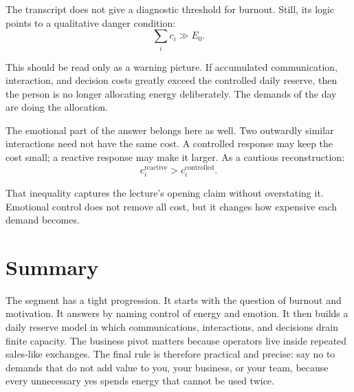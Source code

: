 The transcript does not give a diagnostic threshold for burnout. Still, its logic points to a qualitative danger condition:
\begin{equation}
\sum_i c_i \gg E_0.
\end{equation}

This should be read only as a warning picture. If accumulated communication, interaction, and decision costs greatly exceed the controlled daily reserve, then the person is no longer allocating energy deliberately. The demands of the day are doing the allocation.

The emotional part of the answer belongs here as well. Two outwardly similar interactions need not have the same cost. A controlled response may keep the cost small; a reactive response may make it larger. As a cautious reconstruction:
\begin{equation}
c_i^{\mathrm{reactive}}
>
c_i^{\mathrm{controlled}}.
\end{equation}

That inequality captures the lecture's opening claim without overstating it. Emotional control does not remove all cost, but it changes how expensive each demand becomes.

\section{Summary}

The segment has a tight progression. It starts with the question of burnout and motivation. It answers by naming control of energy and emotion. It then builds a daily reserve model in which communications, interactions, and decisions drain finite capacity. The business pivot matters because operators live inside repeated sales-like exchanges. The final rule is therefore practical and precise: say no to demands that do not add value to you, your business, or your team, because every unnecessary yes spends energy that cannot be used twice.